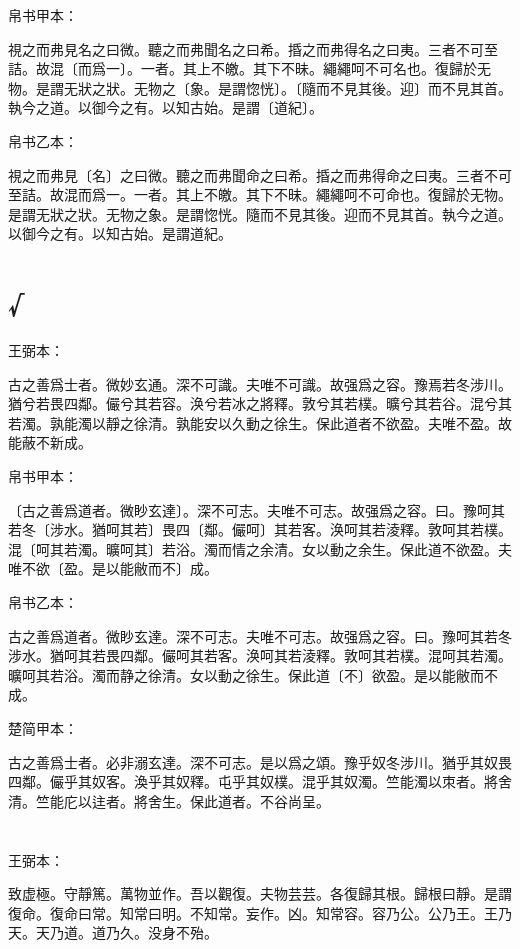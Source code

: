 \documentclass[a5paper]{ctexbook}
\begin{document}
    
    帛书甲本：

    視之而弗見名之曰微。聽之而弗聞名之曰希。捪之而弗得名之曰夷。三者不可至詰。故混〔而爲一〕。一者。其上不皦。其下不昧。繩繩呵不可名也。復歸於无物。是謂无狀之狀。无物之〔象。是謂惚恍〕。〔隨而不見其後。迎〕而不見其首。執今之道。以御今之有。以知古始。是謂〔道紀〕。

    帛书乙本：

    視之而弗見〔名〕之曰微。聽之而弗聞命之曰希。捪之而弗得命之曰夷。三者不可至詰。故混而爲一。一者。其上不皦。其下不昧。繩繩呵不可命也。復歸於无物。是謂无狀之狀。无物之象。是謂惚恍。隨而不見其後。迎而不見其首。執今之道。以御今之有。以知古始。是謂道紀。

    \chapter{√}
    王弼本：

    古之善爲士者。微妙玄通。深不可識。夫唯不可識。故强爲之容。豫焉若冬涉川。猶兮若畏四鄰。儼兮其若容。涣兮若冰之將釋。敦兮其若樸。曠兮其若谷。混兮其若濁。孰能濁以靜之徐清。孰能安以久動之徐生。保此道者不欲盈。夫唯不盈。故能蔽不新成。

    
    帛书甲本：

    〔古之善爲道者。微眇玄達〕。深不可志。夫唯不可志。故强爲之容。曰。豫呵其若冬〔涉水。猶呵其若〕畏四〔鄰。儼呵〕其若客。涣呵其若淩釋。敦呵其若樸。混〔呵其若濁。曠呵其〕若浴。濁而情之余清。女以動之余生。保此道不欲盈。夫唯不欲〔盈。是以能敝而不〕成。

    帛书乙本：

    古之善爲道者。微眇玄達。深不可志。夫唯不可志。故强爲之容。曰。豫呵其若冬涉水。猶呵其若畏四鄰。儼呵其若客。涣呵其若淩釋。敦呵其若樸。混呵其若濁。曠呵其若浴。濁而静之徐清。女以動之徐生。保此道〔不〕欲盈。是以能敝而不成。

    楚简甲本：

    古之善爲士者。必非溺玄達。深不可志。是以爲之頌。豫乎奴冬涉川。猶乎其奴畏四鄰。儼乎其奴客。渙乎其奴釋。屯乎其奴樸。混乎其奴濁。竺能濁以朿者。將舍清。竺能庀以迬者。將舍生。保此道者。不谷尚呈。

    \chapter{}
    王弼本：

    致虚極。守靜篤。萬物並作。吾以觀復。夫物芸芸。各復歸其根。歸根曰靜。是謂復命。復命曰常。知常曰明。不知常。妄作。凶。知常容。容乃公。公乃王。王乃天。天乃道。道乃久。没身不殆。
\end{document}
